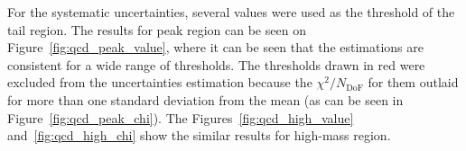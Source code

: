\begin{figure}
\end{figure}

For the systematic uncertainties, several values were used as the threshold of the tail region. The results for peak region can be seen on Figure~\ref{fig:qcd_peak_value}, where it can be seen that the estimations are consistent for a wide range of thresholds. The thresholds drawn in red were excluded from the uncertainties estimation because the $\chi^2/N_\mathrm{DoF}$ for them outlaid for more than one standard deviation from the mean (as can be seen in Figure~\ref{fig:qcd_peak_chi}). The Figures~\ref{fig:qcd_high_value} and~\ref{fig:qcd_high_chi} show the similar results for high-mass region.

